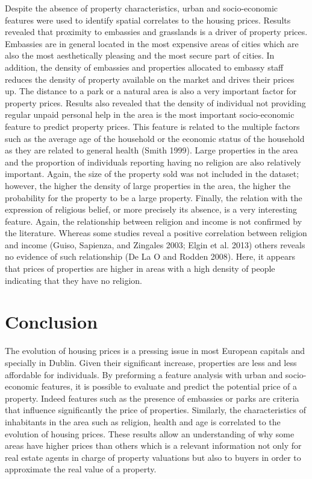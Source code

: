 \documentclass[conference,final,]{IEEEtran}
\begin{document}
Despite the absence of property characteristics, urban and socio-economic features were used to identify spatial correlates to the housing prices. Results revealed that proximity to embassies and grasslands is a driver of property prices. Embassies are in general located in the most expensive areas of cities which are also the most aesthetically pleasing and the most secure part of cities. In addition, the density of embassies and properties allocated to embassy staff reduces the density of property available on the market and drives their prices up. The distance to a park or a natural area is also a very important factor for property prices. Results also revealed that the density of individual not providing regular unpaid personal help in the area is the most important socio-economic feature to predict property prices. This feature is related to the multiple factors such as the average age of the household or the economic status of the household as they are related to general health (Smith 1999). Large properties in the area and the proportion of individuals reporting having no religion are also relatively important. Again, the size of the property sold was not included in the dataset; however, the higher the density of large properties in the area, the higher the probability for the property to be a large property. Finally, the relation with the expression of religious belief, or more precisely its absence, is a very interesting feature. Again, the relationship between religion and income is not confirmed by the literature. Whereas some studies reveal a positive correlation between religion and income (Guiso, Sapienza, and Zingales 2003; Elgin et al. 2013) others reveals no evidence of such relationship (De La O and Rodden 2008). Here, it appears that prices of properties are higher in areas with a high density of people indicating that they have no religion.

\hypertarget{conclusion}{%
\section{Conclusion}\label{conclusion}}

The evolution of housing prices is a pressing issue in most European capitals and specially in Dublin. Given their significant increase, properties are less and less affordable for individuals. By preforming a feature analysis with urban and socio-economic features, it is possible to evaluate and predict the potential price of a property. Indeed features such as the presence of embassies or parks are criteria that influence significantly the price of properties. Similarly, the characteristics of inhabitants in the area such as religion, health and age is correlated to the evolution of housing prices. These results allow an understanding of why some areas have higher prices than others which is a relevant information not only for real estate agents in charge of property valuations but also to buyers in order to approximate the real value of a property.
\end{document}
